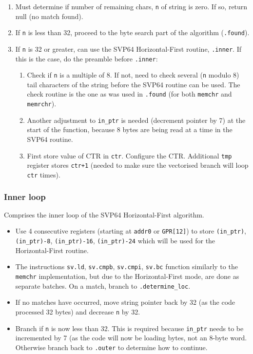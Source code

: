 \begin{enumerate}
  \item Must determine if number of remaining chars, \texttt{n} of
  string is zero. If so, return null (no match found).
  \item If \texttt{n} is less than 32, proceed to the byte search part of
  the algorithm (\texttt{.found}).
  \item If \texttt{n} is 32 or greater, can use the SVP64 Horizontal-First
  routine, \texttt{.inner}. If this is the case, do the preamble
  before \texttt{.inner}:
  \begin{enumerate}
    \item Check if \texttt{n} is a multiple of 8. If not, need to check
    several (\texttt{n} modulo 8) tail characters of the string before the
    SVP64 routine can be used. The check routine is the one as was used in
    \texttt{.found} (for both \texttt{memchr} and \texttt{memrchr}).
    \item Another adjustment to \texttt{in\_ptr} is needed (decrement pointer
    by 7) at the start of the function, because 8 bytes are being read at
    a time in the SVP64 routine.
    \item First store value of \acrshort{CTR} in \texttt{ctr}.
    Configure the \acrshort{CTR}. Additional \texttt{tmp} register stores
    \texttt{ctr+1} (needed to make sure the vectorised branch will loop
    \texttt{ctr} times).
  \end{enumerate}
\end{enumerate}

\subsubsection{Inner loop}

Comprises the inner loop of the SVP64 Horizontal-First algorithm.

\begin{itemize}
  \item Use 4 consecutive registers (starting at \texttt{addr0} or
  \texttt{GPR[12]}) to store \texttt{(in\_ptr)}, \texttt{(in\_ptr)-8},
  \texttt{(in\_ptr)-16}, \texttt{(in\_ptr)-24} which will be used for
  the Horizontal-First routine.
  \item The instructions \texttt{sv.ld}, \texttt{sv.cmpb}, \texttt{sv.cmpi},
  \texttt{sv.bc} function similarly to the \texttt{memchr} implementation,
  but due to the Horizontal-First mode, are done as separate batches.
  On a match, branch to \texttt{.determine\_loc}.
  \item If no matches have occurred, move string pointer back by 32 (as the
  code processed 32 bytes) and decrease \texttt{n} by 32.
  \item Branch if \texttt{n} is now less than 32. This is required because
  \texttt{in\_ptr} needs to be incremented by 7 (as the code will now be
  loading bytes, not an 8-byte word. Otherwise branch back to \texttt{.outer}
  to determine how to continue.
\end{itemize}

